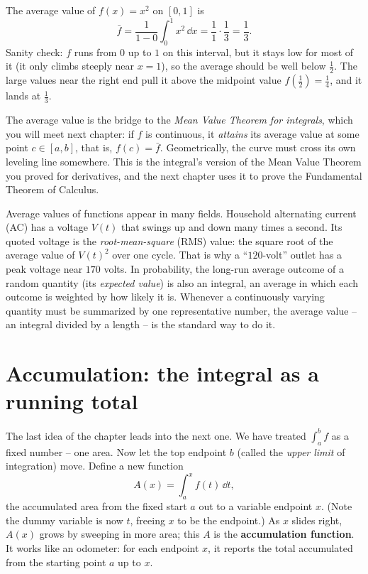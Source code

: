 \begin{example}
\label{ch20:ex-avg}
The average value of $f(x)=x^2$ on $[0,1]$ is
\[
  \bar f = \frac{1}{1-0}\int_0^1 x^2\,\dd x = \frac{1}{1}\cdot\frac13 = \frac13.
\]
Sanity check: $f$ runs from $0$ up to $1$ on this interval, but it stays low for
most of it (it only climbs steeply near $x=1$), so the average should be well
below $\tfrac12$. The large values near the right end pull it above the
midpoint value $f(\tfrac12)=\tfrac14$, and it lands at $\tfrac13$.
\end{example}

\begin{connectionbox}
The average value is the bridge to the \emph{Mean Value Theorem for integrals},
which you will meet next chapter: if $f$ is continuous, it \emph{attains}
its average value at some point $c\in[a,b]$, that is, $f(c)=\bar f$. Geometrically,
the curve must cross its own leveling line somewhere. This is the integral's
version of the Mean Value Theorem you proved for derivatives, and the next
chapter uses it to prove the Fundamental Theorem of Calculus.
\end{connectionbox}

\begin{applicationbox}
Average values of functions appear in many fields. Household alternating
current (AC) has a voltage $V(t)$ that swings up and down many times a second.
Its quoted voltage is the \emph{root-mean-square} (RMS) value: the square root of
the average value of $V(t)^2$ over one cycle. That is why a ``$120$-volt'' outlet
has a peak voltage near $170$ volts. In probability, the long-run average outcome
of a random quantity (its \emph{expected value}) is also an integral, an average
in which each outcome is weighted by how likely it is. Whenever a continuously
varying quantity must be summarized by one representative number, the average
value -- an integral divided by a length -- is the standard way to do it.
\end{applicationbox}

\section{Accumulation: the integral as a running total}
\label{ch20:accumulation}

The last idea of the chapter leads into the next one. We have treated $\int_a^b f$ as
a fixed number -- one area. Now let the top endpoint $b$ (called the \emph{upper
limit} of integration) move. Define a new function
\[
  A(x) = \int_a^x f(t)\,\dd t,
\]
the accumulated area from the fixed start $a$ out to a variable endpoint $x$.
(Note the dummy variable is now $t$, freeing $x$ to be the endpoint.) As $x$
slides right, $A(x)$ grows by sweeping in more area; this $A$ is the
\textbf{accumulation function}. It works like an odometer: for each endpoint $x$, it reports the total accumulated from the starting point $a$ up to $x$.

